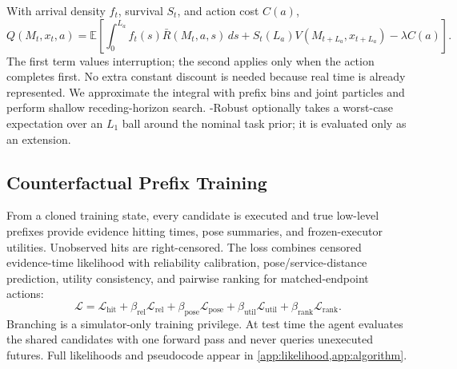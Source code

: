 With arrival density $f_t$, survival $S_t$, and action cost $C(a)$,
\begin{equation}
\label{eq:q}
Q(M_t,x_t,a)=\mathbb{E}\!\left[
\int_0^{L_a} f_t(s)\bar R(M_t,a,s)\,ds+
S_t(L_a)V(M_{t+L_a},x_{t+L_a})-\lambda C(a)\right].
\end{equation}
The first term values interruption; the second applies only when the action completes first.
No extra constant discount is needed because real time is already represented.
We approximate the integral with prefix bins and joint particles and perform shallow receding-horizon search.
\method{}-Robust optionally takes a worst-case expectation over an $L_1$ ball around the nominal task prior; it is evaluated only as an extension.

\subsection{Counterfactual Prefix Training}

From a cloned training state, every candidate is executed and true low-level prefixes provide evidence hitting times, pose summaries, and frozen-executor utilities.
Unobserved hits are right-censored.
The loss combines censored evidence-time likelihood with reliability calibration, pose/service-distance prediction, utility consistency, and pairwise ranking for matched-endpoint actions:
\begin{equation}
\mathcal{L}=\mathcal{L}_{\mathrm{hit}}+
\beta_{\mathrm{rel}}\mathcal{L}_{\mathrm{rel}}+
\beta_{\mathrm{pose}}\mathcal{L}_{\mathrm{pose}}+
\beta_{\mathrm{util}}\mathcal{L}_{\mathrm{util}}+
\beta_{\mathrm{rank}}\mathcal{L}_{\mathrm{rank}}.
\end{equation}
Branching is a simulator-only training privilege.
At test time the agent evaluates the shared candidates with one \jet{} forward pass and never queries unexecuted futures.
Full likelihoods and pseudocode appear in \cref{app:likelihood,app:algorithm}.

